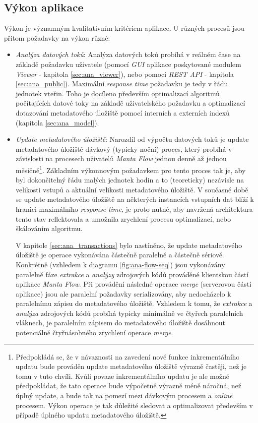 \subsection{Výkon aplikace}
\label{sec:ana_performance}
Výkon je významným kvalitativním kritériem aplikace. U různých procesů jsou přitom požadavky na výkon různé:
\begin{itemize}
	\item{\textit{Analýza datových toků}}: Analýza datových toků probíhá v reálném čase na základě požadavku uživatele (pomocí \textit{GUI} aplikace poskytované modulem \textit{Viewer} - kapitola \ref{sec:ana_viewer}), nebo pomocí \textit{REST API} - kapitola \ref{sec:ana_public}). Maximální \textit{response time} požadavku je tedy v řádu jednotek vteřin. Toho je docíleno především optimalizací algoritmů počítajících datové toky na základě uživatelského požadavku a optimalizací dotazování metadatového úložiště pomocí interních a externích indexů (kapitola \ref{sec:ana_model}).

	\item{\textit{Update metadatového úložiště}}: Narozdíl od výpočtu datových toků je update metadatového úložiště dávkový (typicky noční) proces, který probíhá v závislosti na procesech uživatelů \textit{Manta Flow} jednou denně až jednou měsíčně\footnote{Předpokládá se, že v návaznosti na zavedení nové funkce inkrementálního updatu \cite{Sykora17} bude prováděn update metadatového úložiště výrazně častěji, než je tomu v tuto chvíli. Kvůli povaze inkrementálního updatu je ale možné předpokládat, že tato operace bude výpočetně výrazně méně náročná, než úplný update, a bude tak na pomezí mezi dávkovým procesem a \textit{online} procesem. Výkon operace je tak důležité sledovat a optimalizovat především v případě úplného updatu metadatového úložiště.}. Základním výkonnovým požadavkem pro tento proces tak je, aby byl dokončitelný řádu malých jednotek hodin a to (teoreticky) nezávisle na velikosti vstupů a aktuální velikosti metadatového úložiště. V současné době se update metadatového úložiště na některých instancích vstupních dat blíží k hranici maximálního \textit{response time}, je proto nutné, aby navržená architektura tento stav reflektovala a umožnila zrychlení procesu optimalizací, nebo škálováním algoritmu.

	V kapitole \ref{sec:ana_transactions} bylo nastíněno, že update metadatového úložiště je operace vykonávána částečně paralelně a částečně sériově. Konkrétně (vzhledem k diagramu \ref{fig:ana-flow-seq}) jsou vykonávány paralelně fáze \textit{extrakce} a \textit{analýzy} zdrojových kódů prováděné klientskou částí aplikace \textit{Manta Flow}. Při provádění následné operace \textit{merge} (serverovou částí aplikace) jsou ale paralelní požadavky serializovány, aby nedocházelo k paralelnímu zápisu do metadatového úložiště. Vzhledem k tomu, že \textit{extrakce} a \textit{analýza} zdrojových kódů probíhá typicky minimálně ve čtyřech paralelních vláknech, je paralelním zápisem do metadatového úložiště dosáhnout potenciálně čtyřnásobného zrychlení operace \textit{merge}.


\end{itemize}
